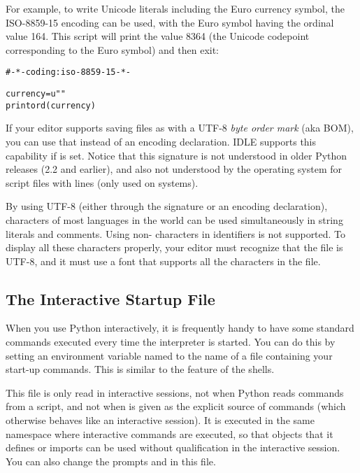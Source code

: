 \documentclass{manual}
\begin{document}
For example, to write Unicode literals including the Euro currency
symbol, the ISO-8859-15 encoding can be used, with the Euro symbol
having the ordinal value 164.  This script will print the value 8364
(the Unicode codepoint corresponding to the Euro symbol) and then
exit:

\begin{alltt}
# -*- coding: iso-8859-15 -*-

currency = u"\texteuro"
print ord(currency)
\end{alltt}

If your editor supports saving files as  with a UTF-8
\emph{byte order mark} (aka BOM), you can use that instead of an
encoding declaration. IDLE supports this capability if
 is set. Notice
that this signature is not understood in older Python releases (2.2
and earlier), and also not understood by the operating system for
script files with \code{\#!} lines (only used on \UNIX{} systems).

By using UTF-8 (either through the signature or an encoding
declaration), characters of most languages in the world can be used
simultaneously in string literals and comments.  Using non-\ASCII{}
characters in identifiers is not supported. To display all these
characters properly, your editor must recognize that the file is
UTF-8, and it must use a font that supports all the characters in the
file.

\subsection{The Interactive Startup File \label{startup}}


When you use Python interactively, it is frequently handy to have some
standard commands executed every time the interpreter is started.  You
can do this by setting an environment variable named
 to the name of a file containing your start-up
commands.  This is similar to the  feature of the
\UNIX{} shells.

This file is only read in interactive sessions, not when Python reads
commands from a script, and not when  is given as the
explicit source of commands (which otherwise behaves like an
interactive session).  It is executed in the same namespace where
interactive commands are executed, so that objects that it defines or
imports can be used without qualification in the interactive session.
You can also change the prompts  and  in
this file.
\end{document}
